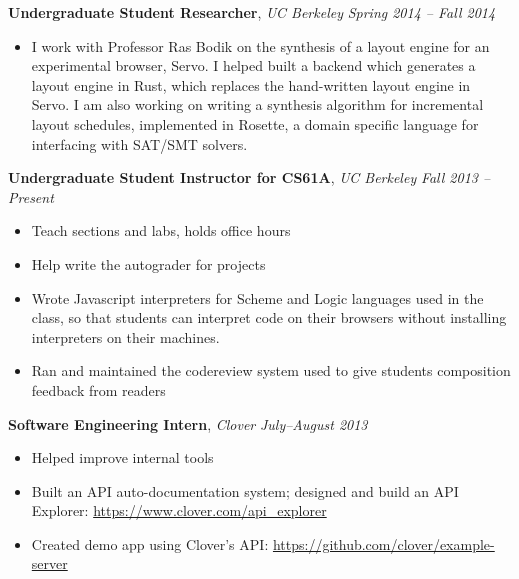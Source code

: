 \documentclass[9pt]{article}
\newenvironment{changemargin}[2]{%
  \begin{list}{}{%
      \setlength{\topsep}{0pt}%
      \setlength{\leftmargin}{#1}%
      \setlength{\rightmargin}{#2}%
      \setlength{\listparindent}{\parindent}%
      \setlength{\itemindent}{\parindent}%
      \setlength{\parsep}{\parskip}%
    }%
  \item[]}{\end{list}
}
\newenvironment{body} {
  \vspace*{-16pt}
  \begin{changemargin}{-0.25in}{-0.5in}
  }
  {\end{changemargin}
}
\begin{document}
\begin{body}
  \vspace{14pt}

  \textbf{Undergraduate Student Researcher}, \emph{UC Berkeley} \hfill \emph{Spring 2014 -- Fall 2014}\\
  \vspace*{-4pt}
  \begin{itemize} \itemsep -0pt  %
  \item I work with Professor Ras Bodik on the synthesis of a layout engine for
    an experimental browser, Servo. I helped built a backend which generates a
    layout engine in Rust, which replaces the hand-written layout engine in
    Servo. I am also working on writing a synthesis algorithm for incremental
    layout schedules, implemented in Rosette, a domain specific language for
    interfacing with SAT/SMT solvers.
  \end{itemize}

  \textbf{Undergraduate Student Instructor for CS61A}, \emph{UC Berkeley} \hfill \emph{Fall 2013 -- Present}\\
  \vspace*{-4pt}
  \begin{itemize} \itemsep -0pt  %
  \item Teach sections and labs, holds office hours
  \item Help write the autograder for projects
  \item Wrote Javascript interpreters for Scheme and Logic languages used in the
    class, so that students can interpret code on their browsers without
    installing interpreters on their machines.
  \item Ran and maintained the codereview system used to give students
    composition feedback from readers
  \end{itemize}

  \textbf{Software Engineering Intern}, \emph{Clover} \hfill \emph{July--August 2013}\\
  \vspace*{-4pt}
  \begin{itemize} \itemsep -0pt  %
  \item Helped improve internal tools
  \item Built an API auto-documentation system; designed and build an API     Explorer: \url{https://www.clover.com/api_explorer}
  \item Created demo app using Clover's API:     \url{https://github.com/clover/example-server}
  \end{itemize}


\end{body}
\end{document}
